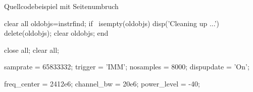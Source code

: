 Quellcodebeispiel mit Seitenumbruch

\singlespacing
\begin{matlab}[firstnumber=1, name=MATLABCodeBeispiel, caption={MATLAB Code Beispiel}, label={lst:MATLABCodeBeispiel}]
clear all
oldobjs=instrfind;
if ~isempty(oldobjs)
disp('Cleaning up ...')
delete(oldobjs);
clear oldobjs;
end

close all;
clear all;


samprate = 65833332;    %
trigger = 'IMM';        %
nosamples = 8000;       %
dispupdate = 'On';      %

freq_center = 2412e6;
channel_bw = 20e6;
power_level = -40; %
\end{matlab}
\onehalfspacing

\begin{figure}[htbp]
	\centering
	\label{fig:mathplot}
\end{figure}